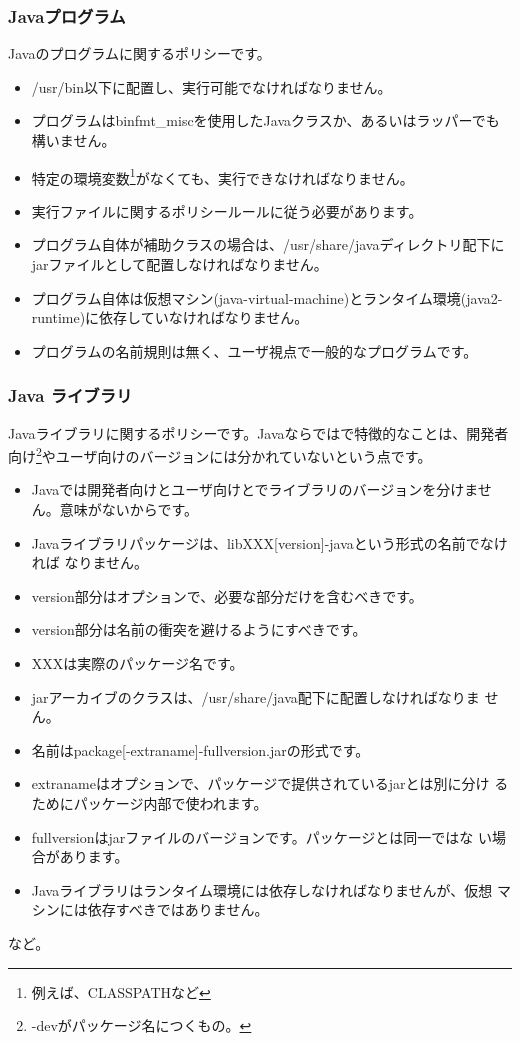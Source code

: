 \documentclass[mingoth,a4paper]{jsarticle}
\begin{document}
\subsubsection{Javaプログラム}
Javaのプログラムに関するポリシーです。
\begin{itemize}
\item /usr/bin以下に配置し、実行可能でなければなりません。
\item プログラムはbinfmt\_miscを使用したJavaクラスか、あるいはラッパーでも構いません。
\item 特定の環境変数\footnote{例えば、CLASSPATHなど}がなくても、実行できなければなりません。
\item 実行ファイルに関するポリシールールに従う必要があります。
\item プログラム自体が補助クラスの場合は、/usr/share/javaディレクトリ配下にjarファイルとして配置しなければなりません。
\item プログラム自体は仮想マシン(java-virtual-machine)とランタイム環境(java2-runtime)に依存していなければなりません。
\item プログラムの名前規則は無く、ユーザ視点で一般的なプログラムです。
\end{itemize}

\subsubsection{Java ライブラリ}
Javaライブラリに関するポリシーです。Javaならではで特徴的なことは、開発者向け\footnote{-devがパッケージ名につくもの。}やユーザ向けのバージョンには分かれていないという点です。

\begin{itemize}
\item Javaでは開発者向けとユーザ向けとでライブラリのバージョンを分けませ
      ん。意味がないからです。
\item Javaライブラリパッケージは、libXXX[version]-javaという形式の名前でなければ
      なりません。
\item version部分はオプションで、必要な部分だけを含むべきです。
\item version部分は名前の衝突を避けるようにすべきです。
\item XXXは実際のパッケージ名です。
\item jarアーカイブのクラスは、/usr/share/java配下に配置しなければなりま
      せん。
\item 名前はpackage[-extraname]-fullversion.jarの形式です。
\item extranameはオプションで、パッケージで提供されているjarとは別に分け
      るためにパッケージ内部で使われます。
\item fullversionはjarファイルのバージョンです。パッケージとは同一ではな
      い場合があります。
\item Javaライブラリはランタイム環境には依存しなければなりませんが、仮想
      マシンには依存すべきではありません。
\end{itemize}
など。
\end{document}
